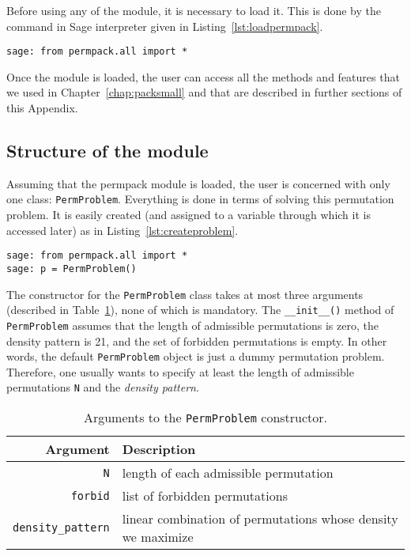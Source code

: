 \documentclass[12pt, a4paper, twoside]{report}
\begin{document}
Before using any of the module, it is necessary to load it. This is done by the command in Sage interpreter given in Listing~\ref{lst:loadpermpack}.
 {}
\begin{lstlisting}
sage: from permpack.all import *
\end{lstlisting}
Once the module is loaded, the user can access all the methods and features that we used in Chapter~\ref{chap:packsmall} and that are described in further sections of this Appendix.

\subsection{Structure of the module}
\label{sec:permpack:module_structure}
Assuming that the permpack module is loaded, the user is concerned with only one class: \texttt{PermProblem}. Everything is done in terms of solving this permutation problem. It is easily created (and assigned to a variable through which it is accessed later) as in Listing~\ref{lst:createproblem}. 
 {}
\begin{lstlisting}
sage: from permpack.all import *
sage: p = PermProblem()
\end{lstlisting}

The constructor for the \texttt{PermProblem} class takes at most three arguments (described in Table~\ref{tab:argspermproblem}), none of which is mandatory. The \texttt{\_\_init\_\_()} method of \texttt{PermProblem} assumes that the length of admissible permutations is zero, the density pattern is 21, and the set of forbidden permutations is empty. In other words, the default \texttt{PermProblem} object is just a dummy permutation problem. Therefore, one usually wants to specify at least the length of admissible permutations \texttt{N} and the \emph{density pattern}.

\begin{table}[ht]
  \centering
    \begin{tabular}{r|l}
      \textbf{Argument} & \textbf{Description}\\
      \hline
      \texttt{N} & length of each admissible permutation\\
      \texttt{forbid} & list of forbidden permutations\\
      \texttt{density\_pattern} & linear combination of permutations whose density we maximize
    \end{tabular}
    \caption{Arguments to the \texttt{PermProblem} constructor.}
    \label{tab:argspermproblem}
\end{table}
\end{document}
